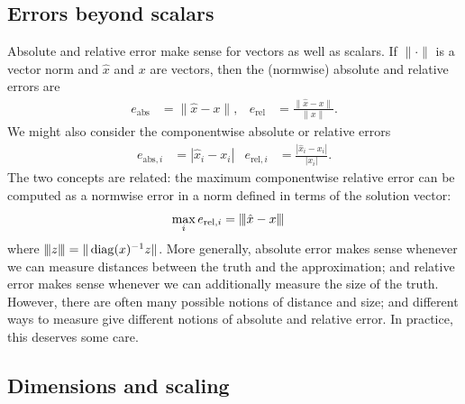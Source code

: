 \documentclass[12pt, leqno]{article} %
\begin{document}
\subsection{Errors beyond scalars}

Absolute and relative error make sense for vectors as well as scalars.
If $\| \cdot \|$ is a vector
norm and $\hat{x}$ and $x$ are vectors, then the (normwise) absolute
and relative errors are
\begin{align*}
  e_{\mathrm{abs}} &= \|\hat{x}-x\|, &
  e_{\mathrm{rel}} &= \frac{\|\hat{x}-x\|}{\|x\|}.
\end{align*}
We might also consider the componentwise absolute or relative errors
\begin{align*}
  e_{\mathrm{abs},i} &= |\hat{x}_i-x_i| &
  e_{\mathrm{rel},i} &= \frac{|\hat{x}_i-x_i|}{|x_i|}.
\end{align*}
The two concepts are related: the maximum componentwise relative error
can be computed as a normwise error in a norm defined in terms of the
solution vector:
\begin{align*}
  \max_i e_{\mathrm{rel},i} &= {\left\vert\kern-0.25ex\left\vert\kern-0.25ex\left\vert \hat{x}-x \right\vert\kern-0.25ex\right\vert\kern-0.25ex\right\vert}
\end{align*}
where ${\left\vert\kern-0.25ex\left\vert\kern-0.25ex\left\vert z \right\vert\kern-0.25ex\right\vert\kern-0.25ex\right\vert} = \|\operatorname{diag}(x)^{-1} z\|$.
More generally, absolute error makes sense whenever we can measure
distances between the truth and the approximation; and relative error
makes sense whenever we can additionally measure the size of the
truth.  However, there are often many possible notions of distance
and size; and different ways to measure give different notions of
absolute and relative error.  In practice, this deserves some care.

\subsection{Dimensions and scaling}
\end{document}
